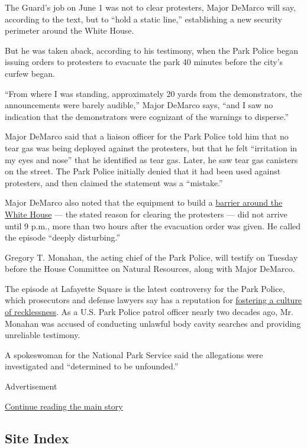 The Guard's job on June 1 was not to clear protesters, Major DeMarco
will say, according to the text, but to ``hold a static line,''
establishing a new security perimeter around the White House.

But he was taken aback, according to his testimony, when the Park Police
began issuing orders to protesters to evacuate the park 40 minutes
before the city's curfew began.

``From where I was standing, approximately 20 yards from the
demonstrators, the announcements were barely audible,'' Major DeMarco
says, ``and I saw no indication that the demonstrators were cognizant of
the warnings to disperse.''

Major DeMarco said that a liaison officer for the Park Police told him
that no tear gas was being deployed against the protesters, but that he
felt ``irritation in my eyes and nose'' that he identified as tear gas.
Later, he saw tear gas canisters on the street. The Park Police
initially denied that it had been used against protesters, and then
claimed the statement was a ``mistake.''

Major DeMarco also noted that the equipment to build a
\href{https://www.nytimes.com/2020/06/05/us/politics/white-house-security.html}{barrier
around the White House} --- the stated reason for clearing the
protesters --- did not arrive until 9 p.m., more than two hours after
the evacuation order was given. He called the episode ``deeply
disturbing.''

Gregory T. Monahan, the acting chief of the Park Police, will testify on
Tuesday before the House Committee on Natural Resources, along with
Major DeMarco.

The episode at Lafayette Square is the latest controversy for the Park
Police, which prosecutors and defense lawyers say has a reputation for
\href{https://www.nytimes.com/2020/06/18/us/politics/park-police-gregory-monahan.html}{fostering
a culture of recklessness}. As a U.S. Park Police patrol officer nearly
two decades ago, Mr. Monahan was accused of conducting unlawful body
cavity searches and providing unreliable testimony.

A spokeswoman for the National Park Service said the allegations were
investigated and ``determined to be unfounded.''

Advertisement

\protect\hyperlink{after-bottom}{Continue reading the main story}

\hypertarget{site-index}{%
\subsection{Site Index}\label{site-index}}

